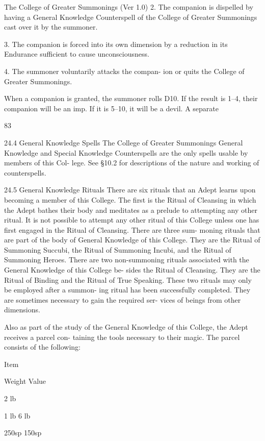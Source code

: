 \begin{Chapter}{The College of Greater Summonings (Ver 1.0)}
2. The companion is dispelled by having a General 
Knowledge Counterspell of the College of  Greater 
Summonings cast over it by the summoner. 

3. The companion is forced into its own dimension 
by a reduction in its Endurance sufficient to cause 
unconsciousness. 

4.  The  summoner  voluntarily  attacks  the  compan-
ion or quits the College of Greater Summonings. 

When a companion is granted, the summoner rolls 
D10.  If  the  result  is  1–4,  their  companion  will  be 
an imp. If it is 5–10, it will be a devil. A separate 

83 

24.4 General Knowledge Spells 
The  College  of  Greater  Summonings  General 
Knowledge  and  Special  Knowledge  Counterspells 
are the only spells usable by members of this Col-
lege.  See  §10.2  for  descriptions  of  the  nature  and 
working of counterspells. 

24.5 General Knowledge Rituals 
There  are  six  rituals  that  an  Adept  learns  upon 
becoming a member of this College. The first is the 
Ritual of Cleansing in which the Adept bathes their 
body and meditates as a prelude to attempting any 
other  ritual.  It  is  not  possible  to  attempt  any  other 
ritual  of  this  College  unless  one  has  first  engaged 
in  the  Ritual  of  Cleansing.  There  are  three  sum-
moning rituals that are part of the body of General 
Knowledge  of this College. They are the Ritual of 
Summoning  Succubi,  the  Ritual  of  Summoning 
Incubi,  and  the  Ritual  of  Summoning  Heroes. 
There  are  two  non-summoning  rituals  associated 
with  the  General  Knowledge  of  this  College  be-
sides  the  Ritual  of  Cleansing.  They  are  the  Ritual 
of Binding and the Ritual of True Speaking. These 
two rituals may only be employed after a summon-
ing  ritual  has  been  successfully  completed.  They 
are  sometimes  necessary  to  gain  the  required  ser-
vices of beings from other dimensions. 

Also as part of the study of the General Knowledge 
of  this  College,  the  Adept  receives  a  parcel  con-
taining  the  tools  necessary  to  their  magic.  The 
parcel consists of the following: 

Item 

Weight  Value 

2 lb 

1 lb 
6 lb 

250sp 
150sp 


\end{Chapter}
